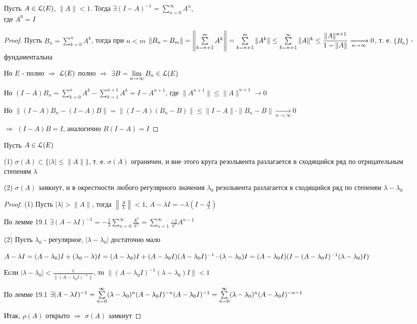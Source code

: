 \documentclass[a4paper,12pt]{report}
\newcommand*{\hm}[1]{#1\nobreak\discretionary{}%
            {\hbox{$\mathsurround=0pt #1$}}{}}
\begin{document}
\begin{lem}
Пусть $A\in\EuScript L(E)$, $\|A\|<1$. Тогда $\exists(I-A)^{-1}=\sum\limits_{n=0}^\infty A^n$, \\ где $A^0=I$
\end{lem}
\begin{proof}
Пусть $B_n=\sum\limits_{k=0}^n A^k$, тогда при $n<m$ $\|B_n-B_m\|\hm=\left\|\sum\limits_{k=n+1}^m A^k\right\|=\sum\limits_{k=n+1}^m\|A^k\|\le\sum\limits_{k=n+1}^\infty\|A\|^k\le\displaystyle\frac{\|A\|^{n+1}}{1-\|A\|}\xrightarrow[n\to\infty]{}0$, т. е. $\{B_n\}$ - фундаментальна

Но $E$ - полно $\Rightarrow$ $\EuScript L(E)$ полно $\Rightarrow$ $\exists B=\lim\limits_{n\to\infty}B_n\in\EuScript L(E)$

Но $(I-A)B_n=\sum\limits_{k=0}^n A^k-\sum\limits_{k=1}^{n+1}A^k=I-A^{n+1}$, где $\|A^{n+1}\|\le\|A\|^{n+1}\to0$

Но $\|(I-A)B_n-(I-A)B\|=\|(I-A)(B_n-B)\|\le\|I-A\|\cdot\|B_n-B\|\xrightarrow[n\to\infty]{}0$

$\Rightarrow$ $(I-A)B=I$, аналогично $B(I-A)=I$ 
\end{proof}
 


\begin{thm}
Пусть $A\in\EuScript L(E)$

(1) $\sigma(A)\subset\{|\lambda|\le\|A\|\}$, т. е. $\sigma(A)$ ограничен, и вне этого круга резольвента разлагается в сходящийся ряд по отрицательным степеням $\lambda$

(2) $\sigma(A)$ замкнут, и в окрестности любого регулярного значения $\lambda_0$ резольвента разлагается в сходящийся ряд по степеням $\lambda-\lambda_0$
\end{thm}
\begin{proof}
(1) Пусть $|\lambda|>\|A\|$, тогда $\left\|\frac{A}\lambda\right\|<1$, $A-\lambda I=-\lambda(I-\frac{A}{\lambda})$

По лемме 19.1 $\exists (A-\lambda I)^{-1}=-\displaystyle\frac1\lambda\sum\limits_{n=0}^\infty\displaystyle\frac{A^n}{\lambda^n}=\sum\limits_{n=1}^\infty\frac{-1}{\lambda^n}A^{n-1}$

(2) Пусть $\lambda_0$ - регулярное, $|\lambda-\lambda_0|$ достаточно мало

$A-\lambda I=(A-\lambda_0)I+(\lambda_0-\lambda)I=(A-\lambda_0)I+(A-\lambda_0 I)(A-\lambda_0 I)^{-1}\cdot(\lambda-\lambda_0)I\hm=(A-\lambda_0 I)(I-(A-\lambda_0 I)^{-1}(\lambda-\lambda_0)I)$

Если $|\lambda-\lambda_0|<\displaystyle\frac{1}{\|(A-\lambda_0 I)^{-1}\|}$, то $\|(A-\lambda_0 I)^{-1}(\lambda-\lambda_0)I\|<1$

По лемме 19.1 $\exists (A-\lambda I)^{-1}=\sum\limits_{n=0}^\infty(\lambda-\lambda_0)^n(A-\lambda_0 I)^{-n}(A-\lambda_0 I)^{-1}\hm=\sum\limits_{n=0}^\infty(\lambda-\lambda_0)^n(A-\lambda_0 I)^{-n-1}$

Итак, $\rho(A)$ открыто $\Rightarrow$ $\sigma(A)$ замкнут
\end{proof}
 
\end{document}
